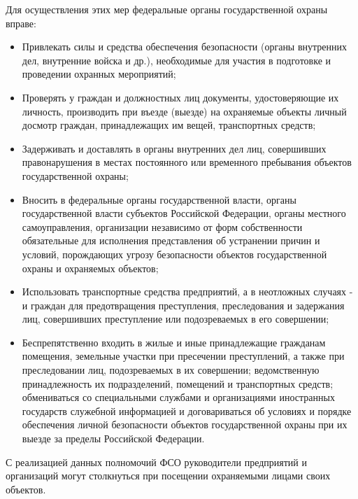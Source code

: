 \documentclass[a4paper,12pt,fleqn]{article} %
\begin{document}
Для осуществления этих мер федеральные органы государственной охраны вправе:

\begin{itemize}
	\item Привлекать силы и средства обеспечения безопасности (органы внутренних дел, внутренние войска и др.), необходимые для участия в подготовке и проведении охранных мероприятий; 
	\item Проверять у граждан и должностных лиц документы, удостоверяющие их личность, производить при въезде (выезде) на охраняемые объекты личный досмотр граждан, принадлежащих им вещей, транспортных средств; 
	\item Задерживать и доставлять в органы внутренних дел лиц, совершивших правонарушения в местах постоянного или временного пребывания объектов государственной охраны; 
	\item Вносить в федеральные органы государственной власти, органы государственной власти субъектов Российской Федерации, органы местного самоуправления, организации независимо от форм собственности обязательные для исполнения представления об устранении причин и условий, порождающих угрозу безопасности объектов государственной охраны и охраняемых объектов; 
	\item Использовать транспортные средства предприятий, а в неотложных случаях - и граждан для предотвращения преступления, преследования и задержания лиц, совершивших преступление или подозреваемых в его совершении; 
	\item Беспрепятственно входить в жилые и иные принадлежащие гражданам помещения, земельные участки при пресечении преступлений, а также при преследовании лиц, подозреваемых в их совершении; ведомственную принадлежность их подразделений, помещений и транспортных средств; обмениваться со специальными службами и организациями иностранных государств служебной информацией и договариваться об условиях и порядке обеспечения личной безопасности объектов государственной охраны при их выезде за пределы Российской Федерации.
\end{itemize}

С реализацией данных полномочий ФСО руководители предприятий и организаций могут столкнуться при посещении охраняемыми лицами своих объектов. 
\end{document}
